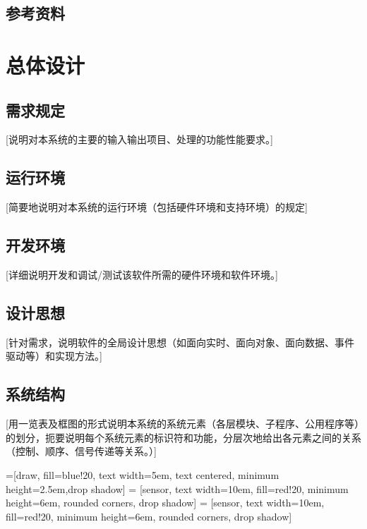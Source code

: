 \documentclass[10pt,a4paper,titlepage]{article} %
\begin{document}
\subsection{参考资料}
\section{总体设计}
\subsection{需求规定}
[说明对本系统的主要的输入输出项目、处理的功能性能要求。]\newline
\subsection{运行环境}
[简要地说明对本系统的运行环境（包括硬件环境和支持环境）的规定]\newline
\subsection{开发环境}
[详细说明开发和调试/测试该软件所需的硬件环境和软件环境。]\newline
\subsection{设计思想}
[针对需求，说明软件的全局设计思想（如面向实时、面向对象、面向数据、事件驱动等）和实现方法。]\newline
\subsection{系统结构}
[用一览表及框图的形式说明本系统的系统元素（各层模块、子程序、公用程序等）的划分，扼要说明每个系统元素的标识符和功能，分层次地给出各元素之间的关系（控制、顺序、信号传递等关系。）]\newline
\usetikzlibrary{shapes,arrows,shadows}

=[draw, fill=blue!20, text width=5em, 
    text centered, minimum height=2.5em,drop shadow]
 = [sensor, text width=10em, fill=red!20, 
    minimum height=6em, rounded corners, drop shadow]
 = [sensor, text width=10em, fill=red!20, 
    minimum height=6em, rounded corners, drop shadow]
\end{document}
